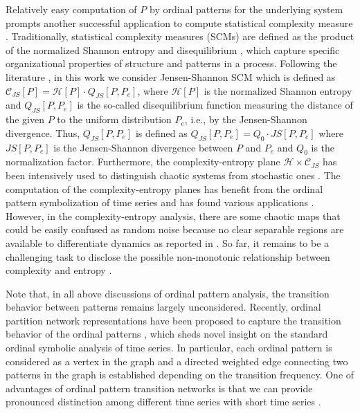 \documentclass[12pt,aip,cha,reprint,nofootinbib]{revtex4-1}
\begin{document}
Relatively easy computation of $P$ by ordinal patterns for the underlying system prompts another successful application to compute statistical complexity measure \cite{kowalskiEntropy2011}. Traditionally, statistical complexity measures (SCMs) are defined as the product of the normalized Shannon entropy and disequilibrium \cite{kowalskiEntropy2011}, which capture specific organizational properties of structure and patterns in a process. Following the literature \cite{rossoPRL2007,LopezPLA1995,kowalskiEntropy2011}, in this work we consider Jensen-Shannon SCM which is defined as $\mathcal{C}_{JS}[P] = \mathcal{H}[P]  \cdot  Q_{JS}[P, P_e]$, where $\mathcal{H}[P]$ is the normalized Shannon entropy and $Q_{JS}[P, P_e]$ is the so-called disequilibrium function measuring the distance of the given $P$ to the uniform distribution $P_e$, i.e., by the Jensen-Shannon divergence. Thus, $Q_{JS}[P, P_e]$ is defined as $Q_{JS}[P, P_e] = Q_{0} \cdot JS[P, P_e]$ where $JS[P, P_e]$ is the Jensen-Shannon divergence between $P$ and $P_e$ and $Q_{0}$ is the normalization factor. Furthermore, the complexity-entropy plane $\mathcal{H} \times \mathcal{C}_{JS}$ has been intensively used to distinguish chaotic systems from stochastic ones \cite{rossoPRL2007}. The computation of the complexity-entropy planes has benefit from the ordinal pattern symbolization of time series and has found various applications \cite{rossoPRL2007,kowalskiEntropy2011}. However, in the complexity-entropy analysis, there are some chaotic maps that could be easily confused as random noise because no clear separable regions are available to differentiate dynamics as reported in \cite{BorgesAMC2019}. So far, it remains to be a challenging task to disclose the possible non-monotonic relationship between complexity and entropy \cite{MartinPLA2003}. 

Note that, in all above discussions of ordinal pattern analysis, the transition behavior between patterns remains largely unconsidered. Recently, ordinal partition network representations have been proposed to capture the transition behavior of the ordinal patterns \cite{MichaelChaos2015,KulpChaos2016,zhangSciRep2017,McCullough2017b,BorgesAMC2019}, which sheds novel insight on the standard ordinal symbolic analysis of time series. In particular, each ordinal pattern is considered as a vertex in the graph and a directed weighted edge connecting two patterns in the graph is established depending on the transition frequency. One of advantages of ordinal pattern transition networks is that we can provide pronounced distinction among different time series with short time series \cite{MichaelChaos2015,BorgesAMC2019}. 
\end{document}

